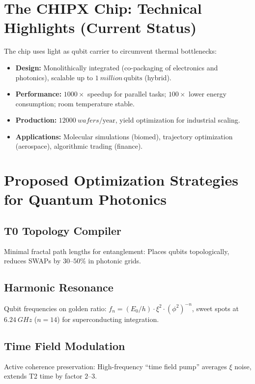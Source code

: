 	\section{The CHIPX Chip: Technical Highlights (Current Status)}
	
	The chip uses light as qubit carrier to circumvent thermal bottlenecks:
	\begin{itemize}
		\item \textbf{Design:} Monolithically integrated (co-packaging of electronics and photonics), scalable up to $\SI{1}{million}\, \text{qubits}$ (hybrid).
		\item \textbf{Performance:} $1000\times$ speedup for parallel tasks; $100\times$ lower energy consumption; room temperature stable.
		\item \textbf{Production:} $\SI{12000}{wafers}/\text{year}$, yield optimization for industrial scaling.
		\item \textbf{Applications:} Molecular simulations (biomed), trajectory optimization (aerospace), algorithmic trading (finance).
	\end{itemize}
	
	\section{Proposed Optimization Strategies for Quantum Photonics}
	
	\subsection{T0 Topology Compiler}
	Minimal fractal path lengths for entanglement: Places qubits topologically, reduces SWAPs by $30$--$50\%$ in photonic grids.
	
	\subsection{Harmonic Resonance}
	Qubit frequencies on golden ratio: $f_n = (E_0 / h) \cdot \xi^2 \cdot (\phi^2)^{-n}$, sweet spots at $\SI{6.24}{GHz}$ ($n=14$) for superconducting integration.
	
	\subsection{Time Field Modulation}
	Active coherence preservation: High-frequency ``time field pump'' averages $\xi$ noise, extends T2 time by factor $2$--$3$.
	
